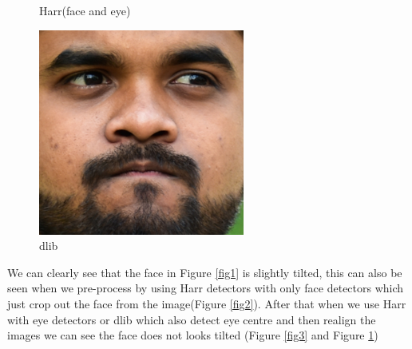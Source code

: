 \begin{figure}[!htb]
      \caption{Harr(face and eye)}\label{fig3}
    \endminipage\hfill
      \includegraphics[width=\linewidth]{dlib.png}
      \caption{dlib}\label{fig4}
    \endminipage
\end{figure}

We can clearly see that the face in Figure \ref{fig1} is slightly tilted, this can also be seen when we pre-process by using Harr detectors with only face detectors which just crop out the face from the image(Figure \ref{fig2}). After that when we use Harr with eye detectors or dlib which also detect eye centre and then realign the images we can see the face does not looks tilted (Figure \ref{fig3} and Figure \ref{fig4})